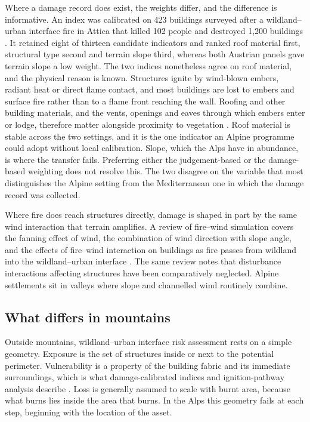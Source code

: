 \documentclass[11pt,a4paper]{article}
\begin{document}
Where a damage record does exist, the weights differ, and the difference is informative. An index was calibrated on 423 buildings surveyed after a wildland--urban interface fire in Attica that killed 102 people and destroyed 1{,}200 buildings \citep{papathomakohle_wildfire_2022}. It retained eight of thirteen candidate indicators and ranked roof material first, structural type second and terrain slope third, whereas both Austrian panels gave terrain slope a low weight. The two indices nonetheless agree on roof material, and the physical reason is known. Structures ignite by wind-blown embers, radiant heat or direct flame contact, and most buildings are lost to embers and surface fire rather than to a flame front reaching the wall. Roofing and other building materials, and the vents, openings and eaves through which embers enter or lodge, therefore matter alongside proximity to vegetation \citep{naser_vulnerability_2025}. Roof material is stable across the two settings, and it is the one indicator an Alpine programme could adopt without local calibration. Slope, which the Alps have in abundance, is where the transfer fails. Preferring either the judgement-based or the damage-based weighting does not resolve this. The two disagree on the variable that most distinguishes the Alpine setting from the Mediterranean one in which the damage record was collected.

Where fire does reach structures directly, damage is shaped in part by the same wind interaction that terrain amplifies. A review of fire--wind simulation covers the fanning effect of wind, the combination of wind direction with slope angle, and the effects of fire--wind interaction on buildings as fire passes from wildland into the wildland--urban interface \citep{ghodrat_existing_2021}. The same review notes that disturbance interactions affecting structures have been comparatively neglected. Alpine settlements sit in valleys where slope and channelled wind routinely combine.

\subsection{What differs in mountains}

Outside mountains, wildland--urban interface risk assessment rests on a simple geometry. Exposure is the set of structures inside or next to the potential perimeter. Vulnerability is a property of the building fabric and its immediate surroundings, which is what damage-calibrated indices and ignition-pathway analysis describe \citep{papathomakohle_wildfire_2022, naser_vulnerability_2025}. Loss is generally assumed to scale with burnt area, because what burns lies inside the area that burns. In the Alps this geometry fails at each step, beginning with the location of the asset.
\end{document}
